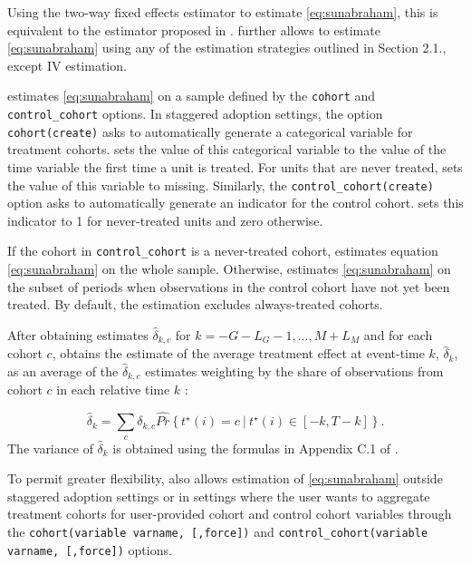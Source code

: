\documentclass[12pt]{article}
\begin{document}
Using the two-way fixed effects estimator to estimate \eqref{eq:sunabraham}, this is equivalent to the estimator proposed in \cite{sun2021estimating}. \xtevent further allows to estimate \eqref{eq:sunabraham} using any of the estimation strategies outlined in Section 2.1., except IV estimation.

\xtevent estimates \eqref{eq:sunabraham} on a sample defined by the \texttt{cohort} and \texttt{control\_cohort} options.
In staggered adoption settings, the option \texttt{cohort(create)} asks \xtevent to automatically generate a categorical variable for treatment cohorts.
\xtevent sets the value of this categorical variable to the value of the time variable the first time a unit is treated.
For units that are never treated, \xtevent sets the value of this variable to missing.
Similarly, the \texttt{control\_cohort(create)} option asks \xtevent to automatically generate an indicator for the control cohort.
\xtevent sets this indicator to 1 for never-treated units and zero otherwise.

If the cohort in \texttt{control\_cohort} is a never-treated cohort, \xtevent estimates equation \eqref{eq:sunabraham} on the whole sample.
Otherwise, \xtevent estimates \eqref{eq:sunabraham} on the subset of periods when observations in the control cohort have not yet been treated.
By default, the estimation excludes always-treated cohorts.

After obtaining estimates $\hat{\delta}_{k,c}$ for $k=-G-L_G-1,...,M+L_M$ and for each cohort $c$, \xtevent obtains the estimate of the average treatment effect at event-time $k$, $\hat{\delta}_k$, as an average of the $\hat{\delta}_{k,c}$ estimates weighting by the share of observations from cohort $c$ in each relative time $k$ \citep{sun2021estimating}:

\begin{equation*}
\hat{\delta}_k = \sum_c \delta_{k,c} \hat{Pr} \left\{ t^{\star}(i) = c \ | \ t^{\star}(i) \in [-k,T-k] \right\}.
\end{equation*}
The variance of $\hat{\delta}_k$ is obtained using the formulas in Appendix C.1 of \cite{sun2021estimating}.

To permit greater flexibility, \xtevent also allows estimation of \eqref{eq:sunabraham} outside staggered adoption settings or in settings where the user wants to aggregate treatment cohorts for user-provided cohort and control cohort variables through the \texttt{cohort(variable varname, [,force])} and \texttt{control\_cohort(variable varname, [,force])} options.
\end{document}
